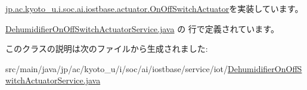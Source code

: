 \hyperlink{interfacejp_1_1ac_1_1kyoto__u_1_1i_1_1soc_1_1ai_1_1iostbase_1_1actuator_1_1_on_off_switch_actuator_ae8a7a45969693afae8233c7f07979078}{jp.\-ac.\-kyoto\-\_\-u.\-i.\-soc.\-ai.\-iostbase.\-actuator.\-On\-Off\-Switch\-Actuator}を実装しています。



 \hyperlink{_dehumidifier_on_off_switch_actuator_service_8java_source}{Dehumidifier\-On\-Off\-Switch\-Actuator\-Service.\-java} の  行で定義されています。



このクラスの説明は次のファイルから生成されました\-:\begin{DoxyCompactItemize}
\item 
src/main/java/jp/ac/kyoto\-\_\-u/i/soc/ai/iostbase/service/iot/\hyperlink{_dehumidifier_on_off_switch_actuator_service_8java}{Dehumidifier\-On\-Off\-Switch\-Actuator\-Service.\-java}\end{DoxyCompactItemize}
